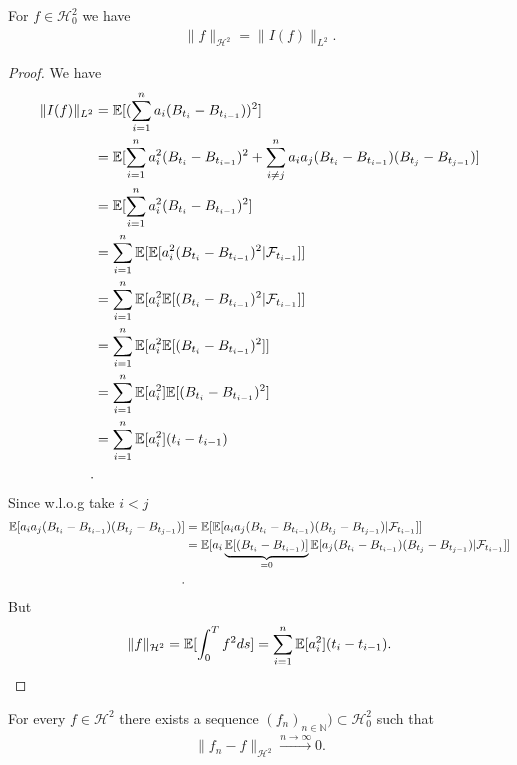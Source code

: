
\begin{Lemma}
 For $f \in  \mathcal{H}_0^{2} $  we have 
 \begin{align*}
   \|f\|_{\mathcal{H}^2} = \|I(f)\|_{L^2}
 .\end{align*}
\end{Lemma}
\begin{proof}
 We have 
 \begin{align*}
   \|I(f)\|_{L^2} &= \mathbb{E}[(\sum_{i=1}^{n} a_i (B_{t_i} - B_{t_{i-1}}))^2]\\
                  &= \mathbb{E}[\sum_{i=1}^{n} a_i^2(B_{t_i}-B_{t_{i-1}})^2 + \sum_{i\neq j}^{n} a_ia_j(B_{t_{i}}-B_{t_{i-1}})(B_{t_{j}}-B_{t_{j-1}})  ]\\
                  &=  \mathbb{E}[\sum_{i=1}^{n} a_i^2(B_{t_i}-B_{t_{i-1}})^2]\\
                  &=  \sum_{i=1}^{n} \mathbb{E}[\mathbb{E}[a_i^2(B_{t_i}-B_{t_{i-1}})^2 | \mathcal{F}_{t_{i-1}}]]\\
                  &=  \sum_{i=1}^{n} \mathbb{E}[a_i^2\mathbb{E}[(B_{t_i}-B_{t_{i-1}})^2 | \mathcal{F}_{t_{i-1}}]]\\
                  &=  \sum_{i=1}^{n} \mathbb{E}[a_i^2\mathbb{E}[(B_{t_i}-B_{t_{i-1}})^2]]\\
                  &=  \sum_{i=1}^{n} \mathbb{E}[a_i^2]\mathbb{E}[(B_{t_i}-B_{t_{i-1}})^2]\\
                  &=  \sum_{i=1}^{n} \mathbb{E}[a_i^2](t_i-t_{i-1})\\
 .\end{align*}
 Since  w.l.o.g take $i<j$
 \begin{align*}
   \mathbb{E}[a_ia_j(B_{t_{i}}-B_{t_{i-1}})(B_{t_{j}}-B_{t_{j-1}})  ] &= \mathbb{E}[\mathbb{E}[a_ia_j(B_{t_{i}}-B_{t_{i-1}})(B_{t_{j}}-B_{t_{j-1}}) | \mathcal{F}_{t_{i-1}}] ]\\
                                                              &= \mathbb{E}[a_i \underbrace{\mathbb{E}[(B_{t_{i}}-B_{t_{i-1}})]}_{=0}\mathbb{E}[a_j(B_{t_{i}}-B_{t_{i-1}})(B_{t_{j}}-B_{t_{j-1}}) | \mathcal{F}_{t_{i-1}}] ]\\
 .\end{align*}
 But 
 \begin{align*}
   \|f\|_{\mathcal{H}^2} = \mathbb{E}[\int_0^{T} f^2 ds ] = \sum_{i=1}^{n}\mathbb{E}[a_i^2](t_i-t_{i-1})
 .\end{align*}
\end{proof}
\begin{Prop}[3.5]
  For every $f \in  \mathcal{H}^2$  there exists a sequence $(f_n)_{n \in  \mathbb{N}}) \subset  \mathcal{H}_0^{2} $ such that 
  \begin{align*}
    \|f_n - f\|_{\mathcal{H}^2}\xrightarrow{n\to \infty} 0
  .\end{align*}
\end{Prop}
